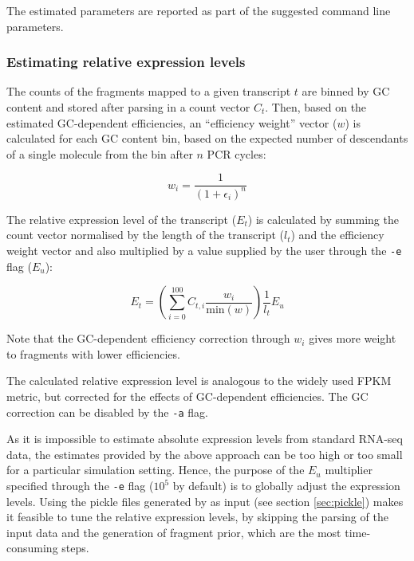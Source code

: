 The estimated parameters are reported as part of the suggested \rlsim command line parameters.

\subsubsection{Estimating relative expression levels}

The counts of the fragments mapped to a given transcript $t$ are binned by GC content and stored after parsing in a count vector $C_t$.
Then, based on the estimated GC-dependent efficiencies, an ``efficiency weight'' vector ($w$) is calculated for each GC content bin, based on the expected number of descendants of a single molecule from the bin after $n$ PCR cycles:

\begin{equation}
    w_i = \frac{1}{\left(1+\epsilon_i\right)^n}
\end{equation}

The relative expression level of the transcript ($E_t$) is calculated by summing the count vector normalised by the length of the transcript ($l_t$) and the efficiency weight vector and also multiplied by a value supplied by the user through the \texttt{-e} flag ($E_u$):

\begin{equation}
    E_t = \left( \sum_{i=0}^{100} C_{t,i} \frac{w_i}{\mathrm{min}(w)} \right) \frac{1}{l_t} E_u
\end{equation}

Note that the GC-dependent efficiency correction through $w_i$ gives more weight to fragments with lower efficiencies.

The calculated relative expression level is analogous to the widely used FPKM metric, but corrected for the effects of GC-dependent efficiencies.
The GC correction can be disabled by the \texttt{-a} flag.

As it is impossible to estimate absolute expression levels from standard RNA-seq data, the estimates provided by the above approach can be too high or too small for a particular simulation setting. Hence, the purpose of the $E_u$ multiplier specified through the \texttt{-e} flag ($10^5$ by default) is to globally adjust the expression levels. Using the pickle files generated by \effest as input (see section \ref{sec:pickle}) makes it feasible to tune the relative expression levels, by skipping the parsing of the input data and the generation of fragment prior, which are the most time-consuming steps.

